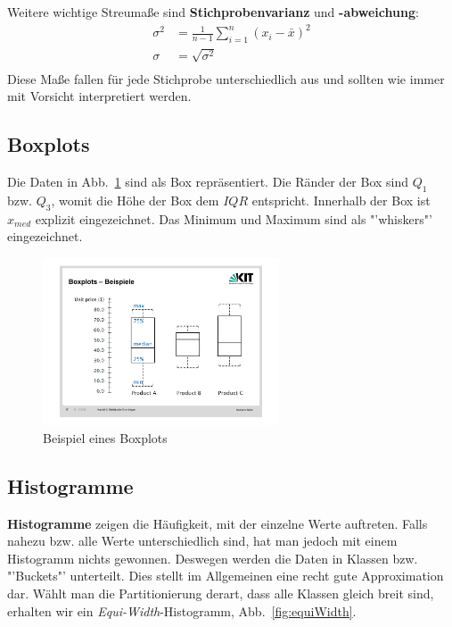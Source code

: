 Weitere wichtige Streumaße sind \textbf{Stichprobenvarianz} und
\textbf{-abweichung}:
\begin{align*}
	\sigma^{2} &= \frac{1}{n-1}\sum\limits_{i=1}^n (x_i -\bar{x})^2 \\
	\sigma &= \sqrt{\sigma^{2}} \\
\end{align*}
Diese Maße fallen für jede Stichprobe unterschiedlich aus und sollten wie immer
mit Vorsicht interpretiert werden.

\subsection{Boxplots}
\noindent Die Daten in Abb.~\ref{fig:boxplot} sind als Box repräsentiert. Die Ränder der Box sind \(Q_1\) bzw. \(Q_3\), womit die Höhe der Box dem \(IQR\) entspricht. Innerhalb der Box ist \(x_{med}\) explizit eingezeichnet. Das Minimum und Maximum sind als "'whiskers"' eingezeichnet.
\begin{figure}[ht]
	\centering
	\includegraphics[width=0.625\textwidth]{Figures/boxplot}
	\caption[Boxplot Beispiel]{Beispiel eines Boxplots \footnotemark}
	\label{fig:boxplot}
\end{figure}

\subsection{Histogramme}
\textbf{Histogramme} zeigen die Häufigkeit, mit der einzelne Werte auftreten.
Falls nahezu bzw. alle Werte unterschiedlich sind, hat man jedoch mit einem
Histogramm nichts gewonnen. Deswegen werden die Daten in Klassen bzw.
"'Buckets"' unterteilt. Dies stellt im Allgemeinen eine recht gute
Approximation dar. Wählt man die Partitionierung derart, dass alle Klassen
gleich breit sind, erhalten wir ein \textit{Equi-Width}-Histogramm,
Abb.~\ref{fig:equiWidth}.

